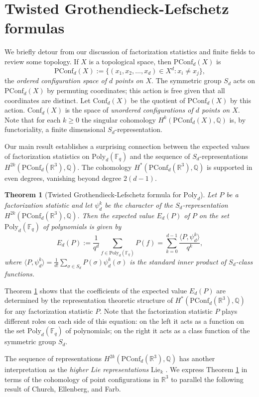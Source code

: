 \documentclass[submission]{FPSAC2018}
\newtheorem{thm}{Theorem}[section]
\theoremstyle{definition}
\numberwithin{equation}{section}
\def\QQ{\mathbb{Q}}
\def\FF{\mathbb{F}}
\def\RR{\mathbb{R}}
\def\Conf{\mathrm{Conf}}
\newcommand\PConf{\mathrm{PConf}}
\newcommand{\poly}{\mathrm{Poly}}
\begin{document}
\section{Twisted Grothendieck-Lefschetz formulas}
\label{section twist}
We briefly detour from our discussion of factorization statistics and finite fields to review some topology. If $X$ is a topological space, then $\PConf_d(X)$ is
\[
    \PConf_d(X) := \{(x_1, x_2, \ldots, x_d) \in X^d : x_i \neq x_j\},
\]
the \emph{ordered configuration space of $d$ points on $X$}. The symmetric group $S_d$ acts on $\PConf_d(X)$ by permuting coordinates; this action is free given that all coordinates are distinct. Let $\Conf_d(X)$ be the quotient of $\PConf_d(X)$ by this action. $\Conf_d(X)$ is the space of \emph{unordered configurations of $d$ points on $X$}. Note that for each $k\geq 0$ the singular cohomology $H^k(\PConf_d(X),\QQ)$ is, by functoriality, a finite dimensional $S_d$-representation.

Our main result establishes a surprising connection between the expected values of factorization statistics on $\poly_d(\FF_q)$ and the sequence of $S_d$-representations $H^{2k}(\PConf_d(\RR^3),\QQ)$. The cohomology $H^\ast(\PConf_d(\RR^3),\QQ)$ is supported in even degrees, vanishing beyond degree $2(d-1)$.

\begin{thm}[Twisted Grothendieck-Lefschetz formula for $\poly_d$]
\label{twisted gl}
Let $P$ be a factorization statistic and let $\psi_d^k$ be the character of the $S_d$-representation $H^{2k}(\PConf_d(\RR^3),\QQ)$. Then the expected value $E_d(P)$ of $P$ on the set $\poly_d(\FF_q)$ of polynomials is given by
\[
	E_d(P) := \frac{1}{q^d}\sum_{f\in \poly_d(\FF_q)}P(f) = \sum_{k=0}^{d-1} \frac{\langle P, \psi_d^k\rangle}{q^k},
\]
where $\langle P, \psi_d^k\rangle = \frac{1}{d!}\sum_{\sigma\in S_d} P(\sigma)\psi_d^k(\sigma)$ is the standard inner product of $S_d$-class functions.
\end{thm}

Theorem \ref{twisted gl} shows that the coefficients of the expected value $E_d(P)$ are determined by the representation theoretic structure of $H^{\ast}(\PConf_d(\RR^3),\QQ)$ for any factorization statistic $P$. Note that the factorization statistic $P$ plays different roles on each side of this equation: on the left it acts as a function on the set $\poly_d(\FF_q)$ of polynomials; on the right it acts as a class function of the symmetric group $S_d$.

The sequence of representations $H^{2k}(\PConf_d(\RR^3),\QQ)$ has another interpretation as the \emph{higher Lie representations} $\mathrm{Lie}_k$ \cite[Sec. 2.6]{HershReiner}. We express Theorem \ref{twisted gl} in terms of the cohomology of point configurations in $\RR^3$ to parallel the following result of Church, Ellenberg, and Farb.
\end{document}
